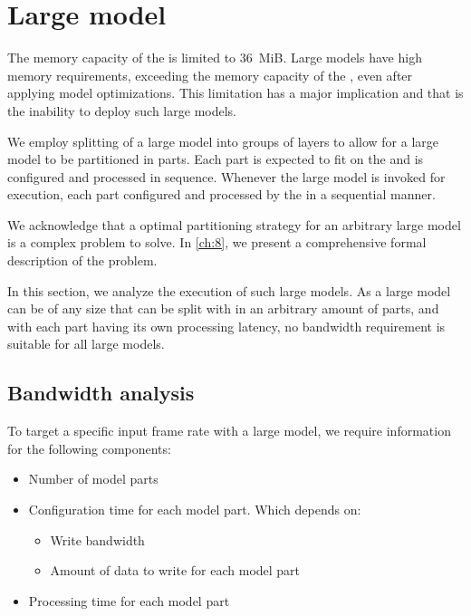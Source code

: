 \section{Large model}



The memory capacity of the \graicore{} is limited to \SI{36}{MiB}.
Large models have high memory requirements, exceeding the memory capacity of the \graicore{}, even after applying model optimizations.
This limitation has a major implication and that is the inability to deploy such large models.

We employ splitting of a large model into groups of layers to allow for a large model to be partitioned in parts.
Each part is expected to fit on the \graicore{} and is configured and processed in sequence.
Whenever the large model is invoked for execution, each part configured and processed by the \graicore{} in a sequential manner.

We acknowledge that a optimal partitioning strategy for an arbitrary large model is a complex problem to solve.
In \cref{ch:8}, we present a comprehensive formal description of the problem.


In this section, we analyze the execution of such large models.
As a large model can be of any size that can be split with in an arbitrary amount of parts, and with each part having its own processing latency, no bandwidth requirement is suitable for all large models.

\subsection{Bandwidth analysis}
To target a specific input frame rate with a large model, we require information for the following components:
\begin{itemize}
    \item Number of model parts
    \item Configuration time for each model part. Which depends on:
    \begin{itemize}
        \item Write bandwidth
        \item Amount of data to write for each model part
    \end{itemize}
    \item Processing time for each model part
\end{itemize}

